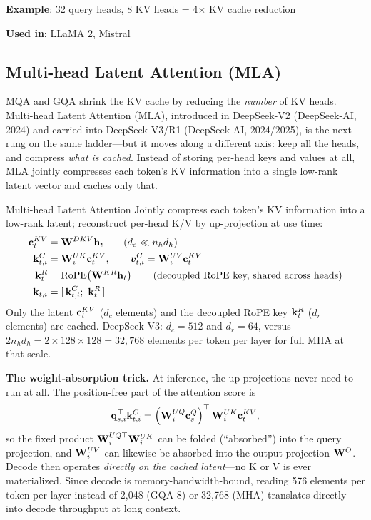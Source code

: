 \textbf{Example}: 32 query heads, 8 KV heads = 4$\times$ KV cache reduction

\textbf{Used in}: LLaMA 2, Mistral

\subsection{Multi-head Latent Attention (MLA)}
\label{sec:mla}

MQA and GQA shrink the KV cache by reducing the \textit{number} of KV heads. Multi-head Latent Attention (MLA), introduced in DeepSeek-V2 (DeepSeek-AI, 2024) and carried into DeepSeek-V3/R1 (DeepSeek-AI, 2024/2025), is the next rung on the same ladder---but it moves along a different axis: keep all the heads, and compress \textit{what is cached}. Instead of storing per-head keys and values at all, MLA jointly compresses each token's KV information into a single low-rank latent vector and caches only that.

\begin{mathresult}{Multi-head Latent Attention}
Jointly compress each token's KV information into a low-rank latent; reconstruct per-head K/V by up-projection at use time:
\begin{align}
\mathbf{c}_t^{KV} &= \mathbf{W}^{DKV} \mathbf{h}_t \qquad (d_c \ll n_h d_h) \\
\mathbf{k}_{t,i}^{C} &= \mathbf{W}_i^{UK} \mathbf{c}_t^{KV}, \qquad \bm{v}_{t,i}^{C} = \mathbf{W}_i^{UV} \mathbf{c}_t^{KV} \\
\mathbf{k}_t^{R} &= \mathrm{RoPE}\!\left(\mathbf{W}^{KR} \mathbf{h}_t\right) \qquad \text{(decoupled RoPE key, shared across heads)} \\
\mathbf{k}_{t,i} &= [\,\mathbf{k}_{t,i}^{C};\ \mathbf{k}_t^{R}\,]
\end{align}
Only the latent $\mathbf{c}_t^{KV}$ ($d_c$ elements) and the decoupled RoPE key $\mathbf{k}_t^{R}$ ($d_r$ elements) are cached. DeepSeek-V3: $d_c = 512$ and $d_r = 64$, versus $2 n_h d_h = 2 \times 128 \times 128 = 32{,}768$ elements per token per layer for full MHA at that scale.
\end{mathresult}

\textbf{The weight-absorption trick.} At inference, the up-projections never need to run at all. The position-free part of the attention score is
\[
\mathbf{q}_{s,i}^{\top} \mathbf{k}_{t,i}^{C} = \left(\mathbf{W}_i^{UQ} \mathbf{c}_s^{Q}\right)^{\top} \mathbf{W}_i^{UK} \mathbf{c}_t^{KV},
\]
so the fixed product $\mathbf{W}_i^{UQ\top} \mathbf{W}_i^{UK}$ can be folded (``absorbed'') into the query projection, and $\mathbf{W}_i^{UV}$ can likewise be absorbed into the output projection $\mathbf{W}^O$. Decode then operates \textit{directly on the cached latent}---no K or V is ever materialized. Since decode is memory-bandwidth-bound, reading 576 elements per token per layer instead of 2,048 (GQA-8) or 32,768 (MHA) translates directly into decode throughput at long context.

